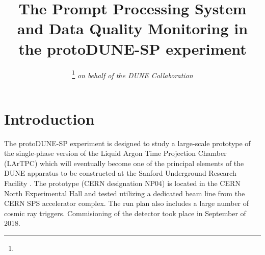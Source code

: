 \documentclass{webofc}
\newcommand{\pd}{protoDUNE\xspace}
\begin{document}
%
\title{The Prompt Processing System and Data Quality Monitoring in the \pd-SP experiment}
%
\author{ 
\fnsep\thanks{} \it{on behalf of the DUNE Collaboration}
}




%
\maketitle
%
\section{Introduction}
\label{sec:intro}
The \pd-SP experiment is designed to study a large-scale prototype of the single-phase version of
the Liquid Argon Time Projection Chamber (LArTPC) which will eventually become one of
the principal elements of the DUNE apparatus to be constructed at the Sanford Underground
Research Facility \cite{cdrVol1, cdrVol4}. The prototype (CERN designation NP04) is located
in the CERN North Experimental Hall and tested utilizing a dedicated beam line from the CERN SPS
accelerator complex. The run plan also includes a large number of cosmic ray triggers.
Commisioning of the detector took place in September of 2018.
\end{document}
